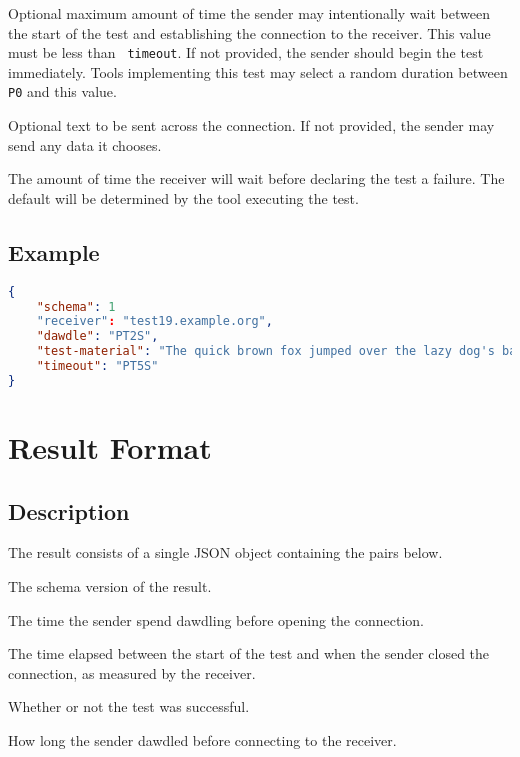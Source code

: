 \documentclass[10pt]{article}
\begin{document}
 Optional maximum amount of time the sender
may intentionally wait between the start of the test and establishing
the connection to the receiver.  This value must be less than {\tt
timeout}.  If not provided, the sender should begin the test
immediately.  Tools implementing this test may select a random
duration between {\tt P0} and this value.

 Optional text to be sent across the
connection.  If not provided, the sender may send any data it chooses.

 The amount of time the receiver will wait
before declaring the test a failure.  The default will be determined
by the tool executing the test.


\subsection{Example}
\begin{lstlisting}[language=json]
{
    "schema": 1
    "receiver": "test19.example.org",
    "dawdle": "PT2S",
    "test-material": "The quick brown fox jumped over the lazy dog's back.",
    "timeout": "PT5S"
}
\end{lstlisting}



%
%

\section{Result Format}

\subsection{Description}
The result consists of a single JSON object containing the pairs
below.  \seejson

 The schema version of the result.

 The time the sender spend dawdling
before opening the connection.

 The time elapsed between the start
of the test and when the sender closed the connection, as measured by
the receiver.

 Whether or not the test was successful.

 How long the sender dawdled before
connecting to the receiver.
\end{document}
